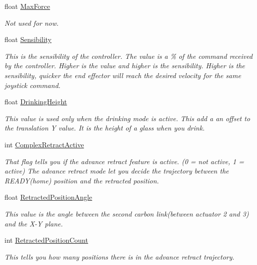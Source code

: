 \begin{DoxyCompactItemize}
float \hyperlink{struct_client_configurations_a9c68b6f56291d1be104928f7db071579}{Max\+Force}
\begin{DoxyCompactList}\small\item\em Not used for now. \end{DoxyCompactList}\item 
float \hyperlink{struct_client_configurations_a64e61dc032b95f127cd798a9759818d8}{Sensibility}
\begin{DoxyCompactList}\small\item\em This is the sensibility of the controller. The value is a \% of the command received by the controller. Higher is the value and higher is the sensibility. Higher is the sensibility, quicker the end effector will reach the desired velocity for the same joystick command. \end{DoxyCompactList}\item 
float \hyperlink{struct_client_configurations_a05043c8fe2f31f3c216a97edc2411664}{Drinking\+Height}
\begin{DoxyCompactList}\small\item\em This value is used only when the drinking mode is active. This add a an offset to the translation Y value. It is the height of a glass when you drink. \end{DoxyCompactList}\item 
int \hyperlink{struct_client_configurations_aa41bf35ba1a1dd92f54a30814d42f795}{Complex\+Retract\+Active}
\begin{DoxyCompactList}\small\item\em That flag tells you if the advance retract feature is active. (0 = not active, 1 = active) The advance retract mode let you decide the trajectory between the R\+E\+A\+D\+Y(home) position and the retracted position. \end{DoxyCompactList}\item 
float \hyperlink{struct_client_configurations_ad7d6245d4683b6e31d0438466ea6bb80}{Retracted\+Position\+Angle}
\begin{DoxyCompactList}\small\item\em This value is the angle between the second carbon link(between actuator 2 and 3) and the X-\/Y plane. \end{DoxyCompactList}\item 
int \hyperlink{struct_client_configurations_a4058c290c5bac0504e511f0f50e5914b}{Retracted\+Position\+Count}
\begin{DoxyCompactList}\small\item\em This tells you how many positions there is in the advance retract trajectory. \end{DoxyCompactList}\item 

\end{DoxyCompactItemize}
